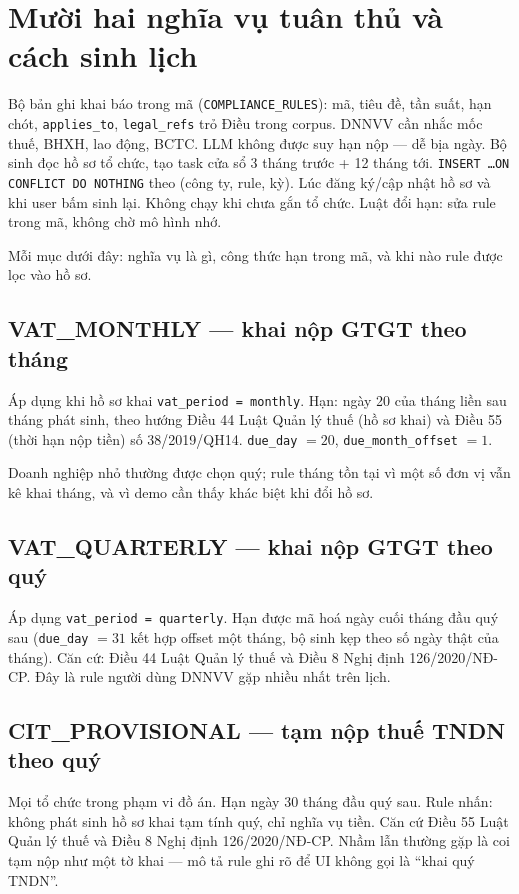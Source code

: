 \section{Mười hai nghĩa vụ tuân thủ và cách sinh lịch}

\boncau
{Bộ \soRule{} bản ghi khai báo trong mã (\texttt{COMPLIANCE\_RULES}): mã, tiêu đề,
tần suất, hạn chót, \texttt{applies\_to}, \texttt{legal\_refs} trỏ Điều trong corpus.}
{DNNVV cần nhắc mốc thuế, BHXH, lao động, BCTC. LLM không được suy hạn nộp ---
dễ bịa ngày.}
{Bộ sinh đọc hồ sơ tổ chức, tạo task cửa sổ 3 tháng trước + 12 tháng tới.
\texttt{INSERT \ldots ON CONFLICT DO NOTHING} theo (công ty, rule, kỳ).}
{Lúc đăng ký/cập nhật hồ sơ và khi user bấm sinh lại. Không chạy khi chưa gắn
tổ chức. Luật đổi hạn: sửa rule trong mã, không chờ mô hình nhớ.}

Mỗi mục dưới đây: nghĩa vụ là gì, công thức hạn trong mã, và khi nào rule được
lọc vào hồ sơ.

\subsection{VAT\_MONTHLY --- khai nộp GTGT theo tháng}

Áp dụng khi hồ sơ khai \texttt{vat\_period = monthly}. Hạn: ngày 20 của tháng
liền sau tháng phát sinh, theo hướng Điều 44 Luật Quản lý thuế (hồ sơ khai) và
Điều 55 (thời hạn nộp tiền) số 38/2019/QH14. \texttt{due\_day} $= 20$,
\texttt{due\_month\_offset} $= 1$.

Doanh nghiệp nhỏ thường được chọn quý; rule tháng tồn tại vì một số đơn vị vẫn
kê khai tháng, và vì demo cần thấy khác biệt khi đổi hồ sơ.

\subsection{VAT\_QUARTERLY --- khai nộp GTGT theo quý}

Áp dụng \texttt{vat\_period = quarterly}. Hạn được mã hoá ngày cuối tháng đầu
quý sau (\texttt{due\_day} $= 31$ kết hợp offset một tháng, bộ sinh kẹp theo số
ngày thật của tháng). Căn cứ: Điều 44 Luật Quản lý thuế và Điều 8 Nghị định
126/2020/NĐ-CP. Đây là rule người dùng DNNVV gặp nhiều nhất trên lịch.

\subsection{CIT\_PROVISIONAL --- tạm nộp thuế TNDN theo quý}

Mọi tổ chức trong phạm vi đồ án. Hạn ngày 30 tháng đầu quý sau. Rule nhấn:
không phát sinh hồ sơ khai tạm tính quý, chỉ nghĩa vụ tiền. Căn cứ Điều 55 Luật
Quản lý thuế và Điều 8 Nghị định 126/2020/NĐ-CP. Nhầm lẫn thường gặp là coi tạm
nộp như một tờ khai --- mô tả rule ghi rõ để UI không gọi là ``khai quý TNDN''.

